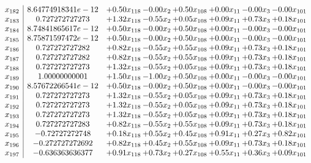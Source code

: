 \documentclass[8pt]{article}
\begin{document}
\[\begin{array}{c| c c@{\hskip 2pt} c@{\hskip 2pt} c@{\hskip 2pt} c@{\hskip 2pt} c@{\hskip 2pt} c@{\hskip 2pt} }
 x_{182}   &  8.64774918341e-12 & +  0.50 x_{118} & -0.00 x_{2} & +  0.50 x_{108} & +  0.00 x_{11} & -0.00 x_{3} & -0.00 x_{101}\\
 x_{183}   &  0.727272727273 & +  1.32 x_{118} & -0.55 x_{2} & +  0.05 x_{108} & +  0.09 x_{11} & +  0.73 x_{3} & +  0.18 x_{101}\\
 x_{184}   &  8.74841865617e-12 & +  0.50 x_{118} & -0.00 x_{2} & +  0.50 x_{108} & +  0.00 x_{11} & -0.00 x_{3} & -0.00 x_{101}\\
 x_{185}   &  8.75871597472e-12 & +  0.50 x_{118} & -0.00 x_{2} & +  0.50 x_{108} & +  0.00 x_{11} & -0.00 x_{3} & -0.00 x_{101}\\
 x_{186}   &  0.727272727282 & +  0.82 x_{118} & -0.55 x_{2} & +  0.55 x_{108} & +  0.09 x_{11} & +  0.73 x_{3} & +  0.18 x_{101}\\
 x_{187}   &  0.727272727282 & +  0.82 x_{118} & -0.55 x_{2} & +  0.55 x_{108} & +  0.09 x_{11} & +  0.73 x_{3} & +  0.18 x_{101}\\
 x_{188}   &  0.727272727273 & +  1.32 x_{118} & -0.55 x_{2} & +  0.05 x_{108} & +  0.09 x_{11} & +  0.73 x_{3} & +  0.18 x_{101}\\
 x_{189}   &  1.00000000001 & +  1.50 x_{118} & -1.00 x_{2} & +  0.50 x_{108} & +  0.00 x_{11} & -0.00 x_{3} & -0.00 x_{101}\\
 x_{190}   &  8.57672266541e-12 & +  0.50 x_{118} & -0.00 x_{2} & +  0.50 x_{108} & +  0.00 x_{11} & -0.00 x_{3} & -0.00 x_{101}\\
 x_{191}   &  0.727272727273 & +  1.32 x_{118} & -0.55 x_{2} & +  0.05 x_{108} & +  0.09 x_{11} & +  0.73 x_{3} & +  0.18 x_{101}\\
 x_{192}   &  0.727272727273 & +  1.32 x_{118} & -0.55 x_{2} & +  0.05 x_{108} & +  0.09 x_{11} & +  0.73 x_{3} & +  0.18 x_{101}\\
 x_{193}   &  0.727272727273 & +  1.32 x_{118} & -0.55 x_{2} & +  0.05 x_{108} & +  0.09 x_{11} & +  0.73 x_{3} & +  0.18 x_{101}\\
 x_{194}   &  0.727272727283 & +  0.82 x_{118} & -0.55 x_{2} & +  0.55 x_{108} & +  0.09 x_{11} & +  0.73 x_{3} & +  0.18 x_{101}\\
 x_{195}   &  -0.72727272748 & +  0.18 x_{118} & +  0.55 x_{2} & +  0.45 x_{108} & +  0.91 x_{11} & +  0.27 x_{3} & +  0.82 x_{101}\\
 x_{196}   &  -0.272727272692 & +  0.82 x_{118} & +  0.45 x_{2} & +  0.55 x_{108} & +  0.09 x_{11} & +  0.73 x_{3} & +  0.18 x_{101}\\
 x_{197}   &  -0.636363636377 & +  0.91 x_{118} & +  0.73 x_{2} & +  0.27 x_{108} & +  0.55 x_{11} & +  0.36 x_{3} & +  0.09 x_{101}\\

\end{array}\]
\end{document}
